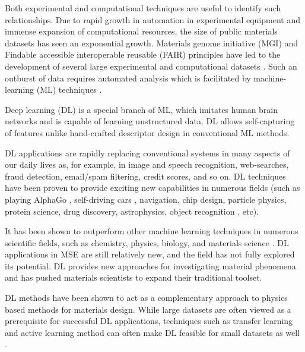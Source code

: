 \documentclass[pdflatex,sn-mathphys]{sn-jnl}%
\theoremstyle{thmstyleone}%
\theoremstyle{thmstyletwo}%
\theoremstyle{thmstylethree}%
\begin{document}
Both experimental and computational techniques are useful to identify such relationships. Due to rapid growth in automation in experimental equipment and immense expansion of computational resources, the size of public materials datasets has seen an exponential growth. Materials genome initiative (MGI) \cite{de2019new} and Findable accessible interoperable reusable (FAIR) \cite{wilkinson2016fair} principles have led to the development of several large experimental and computational datasets  \cite{choudhary2020joint,kirklin2015open,jain2013commentary,curtarolo2012aflow,ramakrishnan2014quantum,draxl2018nomad,wang2005pdbbind,zakutayev2018open}. Such an outburst of data requires automated analysis which is facilitated by machine-learning (ML) techniques \cite{friedman2001elements,vasudevan2019materials,schmidt2019recent,butler2018machine,xu2020deep,schleder2019dft,agrawal2019deep}. 

Deep learning (DL) \cite{Goodfellow-et-al-2016} is a special branch of ML, which imitates human brain networks and is capable of learning unstructured data. DL allows self-capturing of features unlike hand-crafted descriptor design in conventional ML methods. 

DL applications are rapidly replacing conventional systems in many aspects of our daily lives as, for example, in image and speech recognition, web-searches, fraud detection, email/spam filtering, credit scores, and so on. DL techniques have been proven to provide exciting new capabilities in numerous fields (such as playing AlphaGo \cite{gibney2016google}, self-driving cars \cite{ramos2017detecting}, navigation, chip design, particle physics, protein science, drug discovery, astrophysics, object recognition \cite{buduma2017fundamentals}, etc). 

It has been shown to outperform other machine learning techniques in numerous scientific fields, such as chemistry, physics, biology, and materials science \cite{kearnes2016molecular,albrecht2017deep,ge2020deep,agrawal2019deep,erdmann2021deep}. DL applications in MSE are still relatively new, and the field has not fully explored its potential. DL provides new approaches for investigating material phenomena and has pushed materials scientists to expand their traditional toolset.

DL methods have been shown to act as a complementary approach to physics based methods for materials design. While large datasets are often viewed as a prerequisite for successful DL applications, techniques such as transfer learning and active learning method can often make DL  feasible for small datasets as well \cite{chen2019graph,jha2019enhancing,cubuk2019screening}. 
\end{document}
